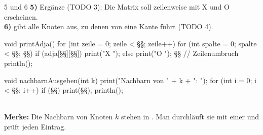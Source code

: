 \documentclass[11pt,a4paper]{article}
\begin{document}
\begin{aufgabe}{5 und 6}
\textbf{5)} Ergänze  (TODO 3): Die Matrix soll zeilenweise mit X und O erscheinen.\\
\textbf{6)}  gibt alle Knoten aus, zu denen von  eine Kante führt (TODO 4).\\[1mm]
\begin{minipage}[t]{0.58\linewidth}
\vspace{0pt}
\begin{java}[basicstyle=\ttfamily\scriptsize]
void printAdja() {
   for (int zeile = 0; zeile < §§; zeile++) {
      for (int spalte = 0; spalte < §§; §§) {
         if (adja[§§][§§]) {
            print("X ");
         } else {
            print("O ");
         }
      }
      §§ // Zeilenumbruch
   }
   println();
}
\end{java}
\end{minipage}\hfill
\begin{minipage}[t]{0.4\linewidth}
\vspace{0pt}
\begin{java}[basicstyle=\ttfamily\scriptsize]
void nachbarnAusgeben(int k) {
   print("Nachbarn von " + k + ": ");
   for (int i = 0; i < §§; i++) {
      if (§§) {
         print(§§);
      }
   }
   println();
}
\end{java}
\end{minipage}\\[1mm]
\textbf{Merke:} Die Nachbarn von Knoten $k$ stehen in . Man durchläuft sie mit einer  und prüft jeden Eintrag.
\end{aufgabe}
\end{document}
